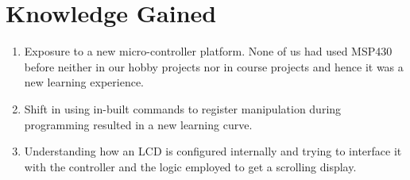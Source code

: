 \documentclass[12pt, letterpaper]{article}
\begin{document}
\section{Knowledge Gained}

\begin{enumerate}
    \item Exposure to a new micro-controller platform. None of us had used MSP430 before neither in our hobby projects nor in course projects and hence it was a new learning experience.
    \item Shift in using in-built commands to register manipulation during programming resulted in a new learning curve.
    \item Understanding how an LCD is configured internally and trying to interface it with the controller and the logic employed to get a scrolling display.
    \end{enumerate}
\end{document}
